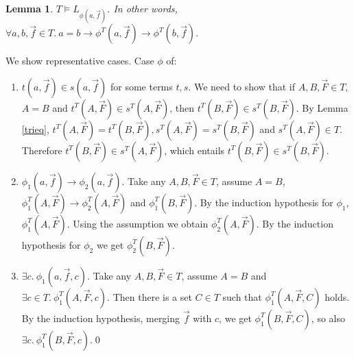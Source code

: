 \documentclass{LMCS}
\newtheorem{lemma}[thm]{Lemma}
\begin{document}
\begin{lemma}\label{tril}
$T \models L_{\phi(a, \vec{f})}$. In other words, $\forall a, b, \vec{f} \in
T.\ a = b \to \phi^T(a, \vec{f}) \to \phi^T(b, \vec{f})$. 
\end{lemma}
\proof We show representative cases. Case $\phi$ of:
\begin{enumerate}[$\bullet$]
\item $t(a, \vec{f}) \in s(a, \vec{f})$ for some terms $t, s$. We need to show
that if $A, B, \vec{F} \in T$, $A = B$ and $t^T(A, \vec{F}) \in s^T(A,
\vec{F})$, then $t^T(B, \vec{F}) \in s^T(B, \vec{F})$. By Lemma \ref{trieq}, $t^T(A, \vec{F}) =
t^T(B, \vec{F}), s^T(A, \vec{F}) = s^T(B, \vec{F})$ and $s^T(A, \vec{F}) \in T$.
Therefore $t^T(B, \vec{F}) \in s^T(A, \vec{F})$, which entails $t^T(B, \vec{F})
\in s^T(B, \vec{F})$.
\item $\phi_1(a, \vec{f}) \to \phi_2(a, \vec{f})$. Take any $A,
B, \vec{F} \in T$, assume $A = B$,  $\phi^T_1(A, \vec{F}) \to
\phi^T_2(A, \vec{F})$ and $\phi^T_1(B, \vec{F})$. By the induction
hypothesis for $\phi_1$,  $\phi^T_1(A, \vec{F})$. Using the assumption we
obtain $\phi^T_2(A, \vec{F})$. By the induction hypothesis for $\phi_2$ we get 
$\phi^T_2(B, \vec{F})$. 
\item $\exists c.\ \phi_1(a, \vec{f}, c)$. Take any $A, B, \vec{F} \in T$,
assume $A = B$ and $\exists c \in T.\ \phi^T_1(A, \vec{F}, c)$. Then there is
a set $C \in T$ such that $\phi^T_1(A, \vec{F},C)$ holds. By the induction
hypothesis, merging $\vec{f}$ with $c$, we get $\phi^T_1(B, \vec{F}, C)$, so also $\exists
c.\ \phi^T_1(B, \vec{F}, c)$.\qed
\end{enumerate}
\end{document}

